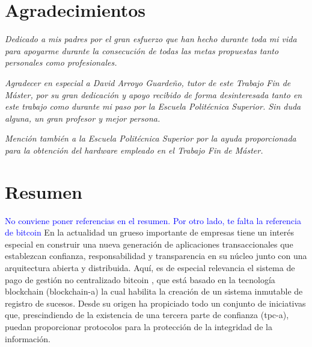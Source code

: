 \documentclass[12pt,a4paper, twoside]{report}
\newcommand\comments[1]{\textcolor{blue}{#1}}%
\newcommand{\blankpage}{
				\newpage
				\thispagestyle{empty}
				\mbox{}
				\newpage
				}
\begin{document}
	\chapter*{Agradecimientos}
	\thispagestyle{empty}
	\vspace{1cm}
	\begin{flushright}
			\textit{Dedicado a mis padres por el gran esfuerzo que han hecho durante toda mi vida para apoyarme durante la consecución de todas las metas propuestas tanto personales como profesionales.} 
			
		\vspace{1cm}	
		
			\textit{Agradecer en especial a David Arroyo Guardeño, tutor de este Trabajo Fin de Máster, por su gran dedicación y apoyo recibido de forma desinteresada tanto en este trabajo como durante mi paso por la Escuela Politécnica Superior. Sin duda alguna, un gran profesor y mejor persona.}
			
		\vspace{1cm}	
		
		\textit{Mención también a la Escuela Politécnica Superior por la ayuda proporcionada para la obtención del hardware empleado en el Trabajo Fin de Máster.}
	\end{flushright}
	
	\blankpage
	
	\chapter*{Resumen}
	\thispagestyle{empty}
	
	\vspace{-0.3cm}

        \comments{No conviene poner referencias en el resumen. Por
          otro lado, te falta la referencia de bitcoin} En la
        actualidad un grueso importante de empresas tiene un interés
        especial en construir una nueva generación de aplicaciones
        transaccionales que establezcan confianza, responsabilidad y
        transparencia en su núcleo junto con una arquitectura abierta
        y distribuida. Aquí, es de especial relevancia el sistema de
        pago de gestión no centralizado \gls{bitcoin} \cite{bitcoin},
        que está basado en la tecnología \Gls{blockchain}
        (\gls{blockchain-a}) \cite{iansiti:2017:ttab} la cual habilita
        la creación de un sistema inmutable de registro de
        sucesos. Desde su origen ha propiciado todo un conjunto de
        iniciativas que, prescindiendo de la existencia de una tercera
        parte de confianza (\gls{tpc-a}), puedan proporcionar
        protocolos para la protección de la integridad de la
        información.
	
\end{document}
